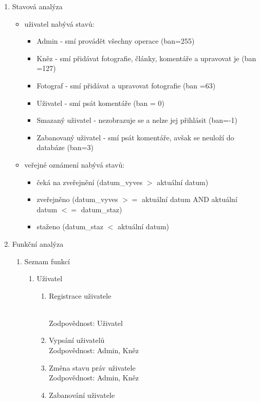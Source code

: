 \documentclass[12pt]{article}
\begin{document}
\begin{enumerate}
\begin{enumerate}[label*=\arabic*.]
		\end{enumerate}%
	\item Stavová analýza
		\begin{itemize}
			\item uživatel nabývá stavů: 
			\begin{itemize} 
				\item Admin - smí provádět všechny operace (ban=255)
				\item Kněz - smí přidávat fotografie, články, komentáře a upravovat je (ban =127)
				\item Fotograf - smí přidávat a upravovat fotografie (ban =63)
				\item Uživatel - smí psát komentáře (ban = 0)
				\item Smazaný uživatel - nezobrazuje se a nelze jej přihlásit \newline(ban=-1)
				\item Zabanovaný uživatel - smí psát komentáře, avšak se neuloží do databáze (ban=3)
			\end{itemize}%
			\item veřejné oznámení nabývá stavů: 
			\begin{itemize}
				\item čeká na zveřejnění (datum\_vyves $>$  aktuální datum)
				\item zveřejněno (datum\_vyves $>=$ aktuální datum AND aktuální datum $<=$ datum\_staz)
				\item staženo (datum\_staz $<$ aktuální datum)
			\end{itemize}
		\end{itemize} %
	\item Funkční analýza
		\begin{enumerate}[label*=\arabic*.]
			\item Seznam funkcí 
			\begin{enumerate}[label*=\arabic*.]
				\item Uživatel 
				\begin{enumerate}[label*=\arabic*.]
					\item \hypertarget{5.1.1.1}{Registrace uživatele} \\
					Zodpovědnost: Uživatel
					\item Vypsání uživatelů\\
					Zodpovědnost: Admin, Kněz
					\item Změna stavu práv uživatele\\
					Zodpovědnost: Admin, Kněz
					\item Zabanování uživatele\\

\end{enumerate}
\end{enumerate}
\end{enumerate}
\end{enumerate}
\end{document}
